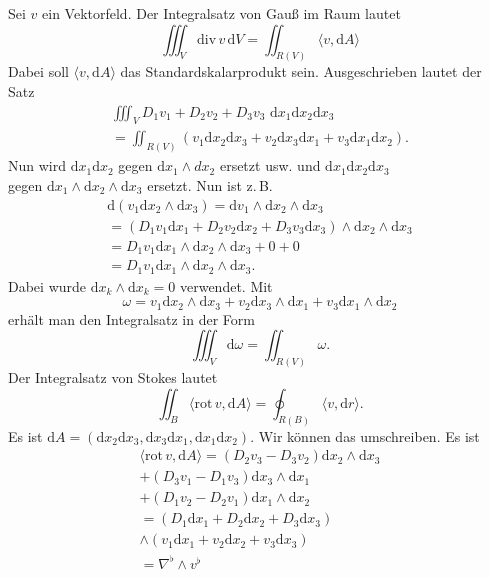 \documentclass[a4paper,11pt,fleqn,twocolumn,twoside]{scrartcl}
\numberwithin{equation}{section}
\begin{document}
%
Sei $v$ ein Vektorfeld. Der Integralsatz von Gauß im Raum lautet
\begin{equation}
\iiint_V \mathrm{div}\,v\,\mathrm dV
= \iint_{R(V)} \langle v,\mathrm dA\rangle
\end{equation}
Dabei soll $\langle v,\mathrm dA\rangle$ das Standardskalarprodukt
sein. Ausgeschrieben lautet der Satz
\begin{gather*}
\iiint_V D_1v_1+D_2v_2+D_3v_3\,\,\mathrm dx_1\mathrm dx_2\mathrm dx_3\\
= \iint_{R(V)}(v_1\mathrm dx_2\mathrm dx_3+v_2\mathrm dx_3\mathrm dx_1
+v_3 \mathrm dx_1\mathrm dx_2).
\end{gather*}
Nun wird $\mathrm dx_1\mathrm dx_2$ gegen
$\mathrm dx_1\wedge dx_2$ ersetzt usw. und
$\mathrm dx_1\mathrm dx_2\mathrm dx_3$\\
gegen $\mathrm dx_1\wedge\mathrm dx_2\wedge\mathrm dx_3$
ersetzt. Nun ist z.\,B.
\begin{gather*}\mathrm d(v_1\mathrm dx_2\wedge\mathrm dx_3)
= \mathrm dv_1\wedge\mathrm dx_2\wedge\mathrm dx_3\\
= (D_1v_1\mathrm dx_1+D_2v_2\mathrm dx_2+D_3v_3\mathrm dx_3)
\wedge\mathrm dx_2\wedge\mathrm dx_3\\
= D_1v_1\mathrm dx_1\wedge\mathrm dx_2\wedge\mathrm dx_3+0+0\\
= D_1v_1\mathrm dx_1\wedge\mathrm dx_2\wedge\mathrm dx_3.
\end{gather*}
Dabei wurde $\mathrm dx_k\wedge\mathrm dx_k=0$ verwendet.
Mit
\begin{equation}
\omega = v_1\mathrm dx_2\wedge\mathrm dx_3
+v_2\mathrm dx_3\wedge\mathrm dx_1
+v_3\mathrm dx_1\wedge\mathrm dx_2
\end{equation}
erhält man den Integralsatz in der Form
\begin{equation}
\iiint_V \mathrm d\omega = \iint_{R(V)} \omega.
\end{equation}
Der Integralsatz von Stokes lautet
\begin{equation}
\iint_B \langle\mathrm{rot}\,v,\mathrm dA\rangle
= \oint_{R(B)} \langle v,\mathrm dr\rangle.
\end{equation}
Es ist
$\mathrm dA = (\mathrm dx_2\mathrm dx_3,\mathrm dx_3\mathrm dx_1,
\mathrm dx_1\mathrm dx_2)$.
Wir können das umschreiben. Es ist
\begin{gather*}
\langle\mathrm{rot}\,v,\mathrm dA\rangle
= (D_2v_3-D_3v_2)\mathrm dx_2\wedge\mathrm dx_3\\
+ (D_3v_1-D_1v_3)\mathrm dx_3\wedge\mathrm dx_1\\
+ (D_1v_2-D_2v_1)\mathrm dx_1\wedge\mathrm dx_2\\
= (D_1\mathrm dx_1+D_2\mathrm dx_2+D_3\mathrm dx_3)\\
\wedge (v_1\mathrm dx_1+v_2\mathrm dx_2+v_3\mathrm dx_3)\\
= \nabla^\flat\wedge v^\flat
\end{gather*}
\end{document}

